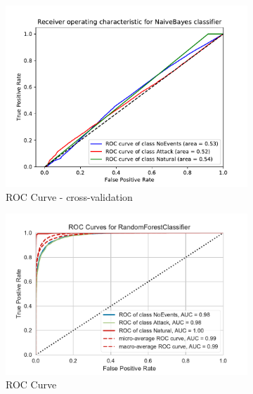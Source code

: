 \begin{figure}[H]
    \begin{subfigure}[t]{0.33\textwidth}
        \centering
        \includegraphics[page=1, width=\linewidth]{images/results_scikit/NaiveBayes}
        \caption{ROC Curve - cross-validation}
        \label{fig:scikit_NB_ROC}
    \end{subfigure}
    \begin{subfigure}[t]{0.33\textwidth}
        \centering
        \includegraphics[page=4, width=\linewidth]{images/roc_3c}
        \caption{ROC Curve}
        \label{fig:scikit_RF_ROC}
    \end{subfigure}
    \begin{subfigure}[t]{0.3\textwidth}
        \centering

\end{subfigure}
\end{figure}
